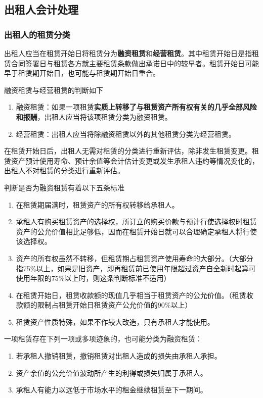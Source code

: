 \documentclass[UTF8,12pt]{ctexart}
\numberwithin{equation}{section} %
\numberwithin{figure}{section}
\numberwithin{table}{section}
\begin{document}
	\subsection{出租人会计处理}
	\subsubsection{出租人的租赁分类}
	出租人应当在租赁开始日将租赁分为\textbf{融资租赁}和\textbf{经营租赁}。其中租赁开始日是指租赁合同签署日与租赁各方就主要租赁条款做出承诺日中的较早者。租赁开始日可能早于租赁期开始日，也可能与租赁期开始日重合。
	
	融资租赁与经营租赁的判断如下
	\begin{enumerate}
		\item 融资租赁：如果一项租赁\textbf{实质上转移了与租赁资产所有权有关的几乎全部风险和报酬}，出租人应当将该项租赁分类为融资租赁。
		
		\item 经营租赁：出租人应当将除融资租赁以外的其他租赁分类为经营租赁。
	\end{enumerate}
	在租赁开始日后，出租人无需对租赁的分类进行重新评估，除非发生租赁变更。租赁资产预计使用寿命、预计余值等会计估计变更或发生承租人违约等情况变化的，出租人不对租赁的分类进行重新评估。
	
	判断是否为融资租赁有着以下五条标准
	\begin{enumerate}
		\item 在租赁期届满时，租赁资产的所有权转移给承租人。
		
		\item 承租人有购买租赁资产的选择权，所订立的购买价款与预计行使选择权时租赁资产的公允价值相比足够低，因而在租赁开始日就可以合理确定承租人将行使该选择权。
		
		\item 资产的所有权虽然不转移，但租赁期占租赁资产使用寿命的大部分。（大部分指75\%以上，如果是旧资产，即再租赁前已使用年限超过资产自全新时起算可使用年限的75\%以上时，则这条判断标准不适用）
		
		\item 在租赁开始日，租赁收款额的现值几乎相当于租赁资产的公允价值。（租赁收款额的限制占租赁开始日租赁资产公允价值的90\%以上）
		
		\item 租赁资产性质特殊，如果不作较大改造，只有承租人才能使用。
	\end{enumerate}

	一项租赁存在下列一项或多项迹象的，也可能分类为融资租赁：
	\begin{enumerate}
		\item 若承租人撤销租赁，撤销租赁对出租人造成的损失由承租人承担。
		
		\item 资产余值的公允价值波动所产生的利得或损失归属于承租人。
		
		\item 承租人有能力以远低于市场水平的租金继续租赁至下一期间。
	\end{enumerate}
	
\end{document}
